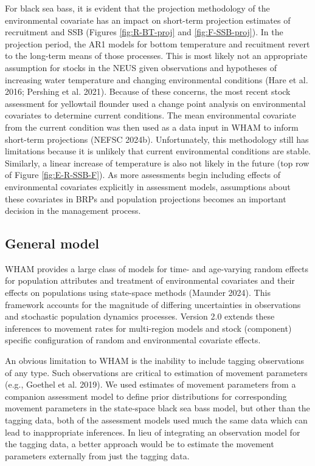 \documentclass[
]{article}
\begin{document}
For black sea bass, it is evident that the projection methodology of the environmental covariate has an impact on short-term projection estimates of recruitment and SSB (Figures \ref{fig:R-BT-proj} and \ref{fig:F-SSB-proj}). In the projection period, the AR1 models for bottom temperature and recuitment revert to the long-term means of those processes. This is most likely not an appropriate assumption for stocks in the NEUS given observations and hypotheses of increasing water temperature and changing environmental conditions (Hare et al. 2016; Pershing et al. 2021). Because of these concerns, the most recent stock assessment for yellowtail flounder used a change point analysis on environmental covariates to determine current conditions. The mean environmental covariate from the current condition was then used as a data input in WHAM to inform short-term projections (NEFSC 2024b). Unfortunately, this methodology still has limitations because it is unlikely that current environmental conditions are stable. Similarly, a linear increase of temperature is also not likely in the future (top row of Figure \ref{fig:E-R-SSB-F}). As more assessments begin including effects of environmental covariates explicitly in assessment models, assumptions about these covariates in BRPs and population projections becomes an important decision in the management process.

\hypertarget{general-model}{%
\subsection*{General model}\label{general-model}}

WHAM provides a large class of models for time- and age-varying random effects for population attributes and treatment of environmental covariates and their effects on populations using state-space methods (Maunder 2024). This framework accounts for the magnitude of differing uncertainties in observations and stochastic population dynamics processes. Version 2.0 extends these inferences to movement rates for multi-region models and stock (component) specific configuration of random and environmental covariate effects.

An obvious limitation to WHAM is the inability to include tagging observations of any type. Such observations are critical to estimation of movement parameters (e.g., Goethel et al. 2019). We used estimates of movement parameters from a companion assessment model to define prior distributions for corresponding movement parameters in the state-space black sea bass model, but other than the tagging data, both of the assessment models used much the same data which can lead to inappropriate inferences. In lieu of integrating an observation model for the tagging data, a better approach would be to estimate the movement parameters externally from just the tagging data.
\end{document}
